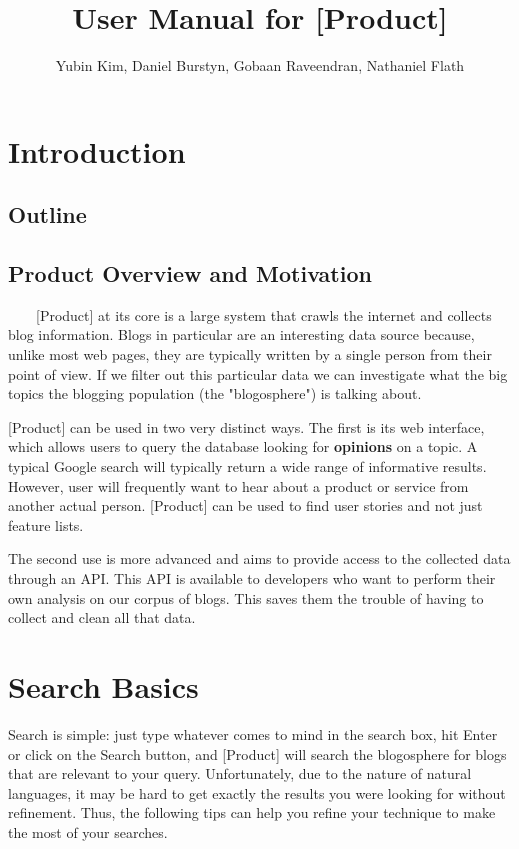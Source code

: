 \documentclass[titlepage]{article}
\title{User Manual for [Product]}
\author{Yubin Kim, Daniel Burstyn, Gobaan Raveendran, Nathaniel Flath}
\begin{document}
\maketitle
\newpage
\tableofcontents
\newpage

\section{Introduction}

\subsection{Outline}

\subsection{Product Overview and Motivation}
\ \ \ \ [Product] at its core is a large system that crawls the internet and
collects blog information.  Blogs in particular are an interesting data source
because, unlike most web pages, they are typically written by a single person
from their point of view.  If we filter out this particular data we can
investigate what the big topics the blogging population (the "blogosphere") is
talking about.

[Product] can be used in two very distinct ways.  The first is its web
interface, which allows users to query the database looking for
\textbf{opinions} on a topic.  A typical Google search will typically return a
wide range of informative results.  However, user will frequently want to hear
about a product or service from another actual person.  [Product] can be used
to find user stories and not just feature lists.

The second use is more advanced and aims to provide access to the collected
data through an API.  This API is available to developers who want to perform
their own analysis on our corpus of blogs.  This saves them the trouble of
having to collect and clean all that data.


\section{Search Basics}
Search is simple: just type whatever comes to mind in the search box, hit
Enter or click on the Search button, and [Product] will search the
blogosphere for blogs that are relevant to your query.  Unfortunately, due to
the nature of natural languages, it may be hard to get exactly the results you
were looking for without refinement. Thus, the following tips can help you
refine your technique to make the most of your searches.
\end{document}
